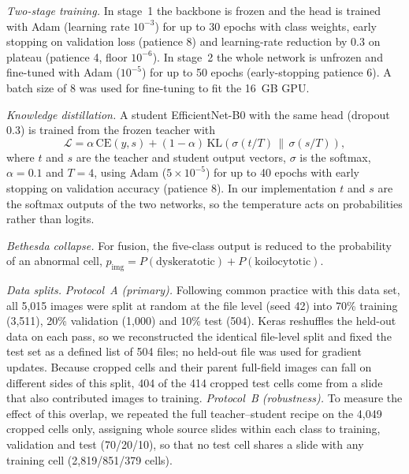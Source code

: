 \documentclass[lettersize,journal]{IEEEtran}
\newcommand{\pimg}{p_{\mathrm{img}}}
\begin{document}
\emph{Two-stage training.} In stage~1 the backbone is frozen and the head is trained with Adam (learning rate $10^{-3}$) for up to 30 epochs with class weights, early stopping on validation loss (patience 8) and learning-rate reduction by $0.3$ on plateau (patience 4, floor $10^{-6}$). In stage~2 the whole network is unfrozen and fine-tuned with Adam ($10^{-5}$) for up to 50 epochs (early-stopping patience 6). A batch size of 8 was used for fine-tuning to fit the 16~GB GPU.

\emph{Knowledge distillation.} A student EfficientNet-B0 with the same head (dropout 0.3) is trained from the frozen teacher \cite{hinton2015distilling} with
\begin{equation}
\mathcal L = \alpha\,\mathrm{CE}(y,s) + (1-\alpha)\,\mathrm{KL}\!\left(\sigma(t/T)\,\|\,\sigma(s/T)\right),
\label{eq:kd}
\end{equation}
where $t$ and $s$ are the teacher and student output vectors, $\sigma$ is the softmax, $\alpha=0.1$ and $T=4$, using Adam ($5\times10^{-5}$) for up to 40 epochs with early stopping on validation accuracy (patience 8). In our implementation $t$ and $s$ are the softmax outputs of the two networks, so the temperature acts on probabilities rather than logits.

\emph{Bethesda collapse.} For fusion, the five-class output is reduced to the probability of an abnormal cell, $\pimg = P(\text{dyskeratotic}) + P(\text{koilocytotic})$.

\emph{Data splits.}
\label{sec:split}
\emph{Protocol~A (primary).} Following common practice with this data set, all 5,015 images were split at random at the file level (seed 42) into 70\% training (3,511), 20\% validation (1,000) and 10\% test (504). Keras reshuffles the held-out data on each pass, so we reconstructed the identical file-level split and fixed the test set as a defined list of 504 files; no held-out file was used for gradient updates. Because cropped cells and their parent full-field images can fall on different sides of this split, 404 of the 414 cropped test cells come from a slide that also contributed images to training. \emph{Protocol~B (robustness).} To measure the effect of this overlap, we repeated the full teacher--student recipe on the 4,049 cropped cells only, assigning whole source slides within each class to training, validation and test (70/20/10), so that no test cell shares a slide with any training cell (2,819/851/379 cells).
\end{document}
